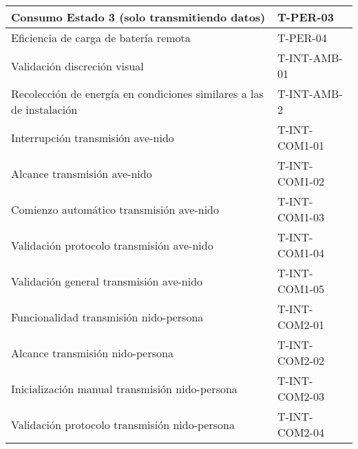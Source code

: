 \begin{table}[H]
\begin{tabular}{|l|l|}
Consumo Estado 3 (solo transmitiendo datos)                                                                          & T-PER-03                                  \\ \hline
Eficiencia de carga de batería remota                                                                                & T-PER-04                                  \\ \hline
Validación discreción visual                                                                                         & T-INT-AMB-01                              \\ \hline
Recolección de energía en condiciones similares a las de instalación                                                 & T-INT-AMB-2                               \\ \hline
Interrupción transmisión ave-nido                                                                                    & T-INT-COM1-01                             \\ \hline
Alcance transmisión ave-nido                                                                                         & T-INT-COM1-02                             \\ \hline
Comienzo automático transmisión ave-nido                                                                             & T-INT-COM1-03                             \\ \hline
Validación protocolo transmisión ave-nido                                                                            & T-INT-COM1-04                             \\ \hline
Validación general transmisión ave-nido                                                                              & T-INT-COM1-05                             \\ \hline
Funcionalidad transmisión nido-persona                                                                               & T-INT-COM2-01                             \\ \hline
Alcance transmisión nido-persona                                                                                     & T-INT-COM2-02                             \\ \hline
Inicialización manual transmisión nido-persona                                                                       & T-INT-COM2-03                             \\ \hline
Validación protocolo transmisión nido-persona                                                                        & T-INT-COM2-04                             \\ \hline

\end{tabular}
\end{table}

